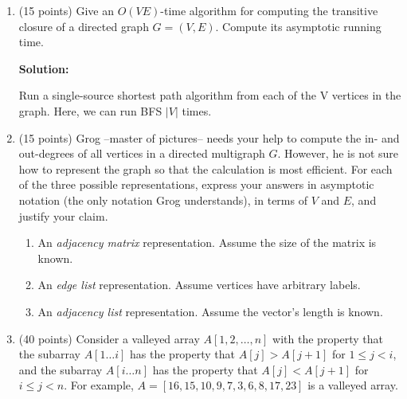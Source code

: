 \documentclass[12pt]{article}
\begin{document}
\renewcommand{\headrulewidth}{0.4pt}

\vspace{-3mm}
\begin{enumerate}
    \item (15 points) Give an $O(VE)$-time algorithm for computing the transitive closure of a directed graph $G=(V,E)$.  
    Compute its asymptotic running time.\par
    \textbf{Solution:}\par
    Run a single-source shortest path algorithm from each of the V vertices in the graph. Here, we can run BFS $|V|$ times.\par
    \pagebreak
    
	\item (15 points) Grog --master of pictures-- needs your help to compute the in- and out-degrees of all vertices in a directed multigraph $G$. However, he is not sure how to represent the graph so that the calculation is most efficient. For each of the three possible representations, express your answers in asymptotic notation (the only notation Grog understands), in terms of $V$ and $E$, and justify your claim.
	\begin{enumerate}
	\item An {\em adjacency matrix} representation. Assume the size of the matrix is known.
	\item An {\em edge list} representation. Assume vertices have arbitrary labels.
	\item An {\em adjacency list} representation. Assume the vector's length is known.
	\end{enumerate}
	
	\pagebreak
    
    \item (40 points) Consider a valleyed array $A[1, 2, \ldots, n]$ with the property that the subarray $A[1\ldots i]$ has the property that $A[j] > A[j + 1]$ for $1 \leq j < i$, and the subarray $A[i \ldots n]$ has the property that $A[j] < A[j + 1]$ for $i \leq j < n$. For example, \newline $A = [16, 15, 10, 9, 7, 3, 6, 8, 17, 23]$ is a valleyed array.
    

\end{enumerate}
\end{document}

